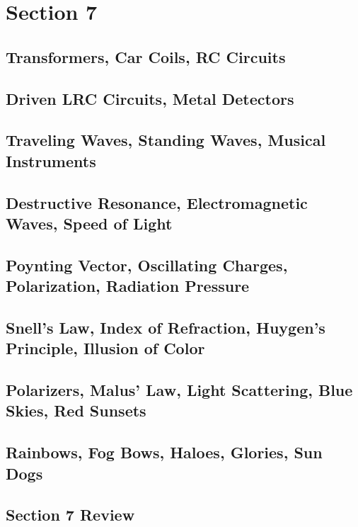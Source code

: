 \documentclass[../introphysics.tex]{subfiles}
\begin{document}
\chapter{Section 7}
\section{Transformers, Car Coils, RC Circuits}
\section{Driven LRC Circuits, Metal Detectors}
\section{Traveling Waves, Standing Waves, Musical Instruments}
\section{Destructive Resonance, Electromagnetic Waves, Speed of Light}
\section{Poynting Vector, Oscillating Charges, Polarization, Radiation Pressure}
\section{Snell's Law, Index of Refraction, Huygen's Principle, Illusion of Color}
\section{Polarizers, Malus' Law, Light Scattering, Blue Skies, Red Sunsets}
\section{Rainbows, Fog Bows, Haloes, Glories, Sun Dogs}
\section{Section 7 Review}
\end{document}
